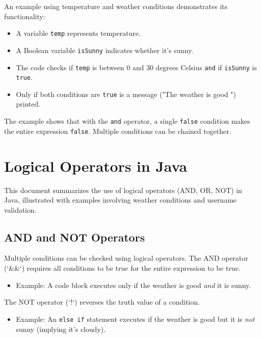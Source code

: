 \documentclass{article}
\begin{document}
An example using temperature and weather conditions demonstrates its functionality:

\begin{itemize}
    \item A variable \texttt{temp} represents temperature.
    \item A Boolean variable \texttt{isSunny} indicates whether it's sunny.
    \item The code checks if \texttt{temp} is between 0 and 30 degrees Celsius \texttt{and} if \texttt{isSunny} is \texttt{true}.
    \item Only if both conditions are \texttt{true} is a message ("The weather is good \smiley{}") printed.
\end{itemize}

The example shows that with the \texttt{and} operator, a single \texttt{false} condition makes the entire expression \texttt{false}.  Multiple conditions can be chained together.


\section{Logical Operators in Java}

This document summarizes the use of logical operators (AND, OR, NOT) in Java, illustrated with examples involving weather conditions and username validation.

\subsection{AND and NOT Operators}

Multiple conditions can be checked using logical operators.  The AND operator (`&&`) requires all conditions to be true for the entire expression to be true.

\begin{itemize}
    \item Example:  A code block executes only if the weather is good \textit{and} it is sunny.
\end{itemize}

The NOT operator (`!`) reverses the truth value of a condition.

\begin{itemize}
    \item Example: An \texttt{else if} statement executes if the weather is good but it is \textit{not} sunny (implying it's cloudy).
\end{itemize}
\end{document}
